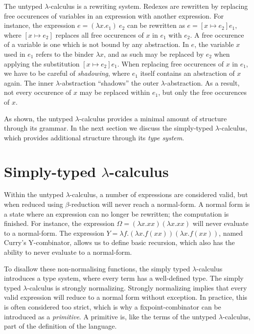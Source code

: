 The untyped $\lambda$-calculus is a rewriting system. 
Redexes are rewritten by replacing free occurences of variables in an expression with another expression.
For instance, the expression $e = (\lambda x.e_1) \: e_2$ can be rewritten as $e = [x \mapsto e_2] e_1$, where $[x \mapsto e_2]$ replaces all free occurences of $x$ in $e_1$ with $e_2$.
A free occurence of a variable is one which is not bound by any abstraction. 
In $e$, the variable $x$ used in $e_1$ refers to the binder $\lambda x$, and as such may be replaced by $e_2$ when applying the substitution $[x \mapsto e_2] e_1$.
When replacing free occurences of $x$ in $e_1$, we have to be careful of \textit{shadowing}, where $e_1$ itself contains an abstraction of $x$ again.
The inner $\lambda$-abstraction ``shadows'' the outer $\lambda$-abstraction.
As a result, not every occurence of $x$ may be replaced within $e_1$, but only the free occurences of $x$.

As shown, the untyped $\lambda$-calculus provides a minimal amount of structure through its grammar. 
In the next section we discuss the simply-typed $\lambda$-calculus, which provides additional structure through its \textit{type system}.

\section{Simply-typed $\lambda$-calculus}
Within the untyped $\lambda$-calculus, a number of expressions are considered valid, but when reduced using $\beta$-reduction will never reach a normal-form.
A normal form is a state where an expression can no longer be rewritten; the computation is finished.
For instance, the expression $\Omega = (\lambda x. x x) (\lambda x. x x)$ will never evaluate to a normal-form.
The expression $Y = \lambda f.( \lambda x.f (x x)) (\lambda x.f (x x))$, named Curry's Y-combinator, allows us to define basic recursion, which also has the ability to never evaluate to a normal-form.

To disallow these non-normalising functions, the simply typed $\lambda$-calculus introduces a type system, where every term has a well-defined type.
The simply typed $\lambda$-calculus is strongly normalizing.
Strongly normalizing implies that every valid expression will reduce to a normal form without exception.
In practice, this is often considered too strict, which is why a fixpoint-combinator can be introduced as a \textit{primitive}.
A primitive is, like the terms of the untyped $\lambda$-calculus, part of the definition of the language.

